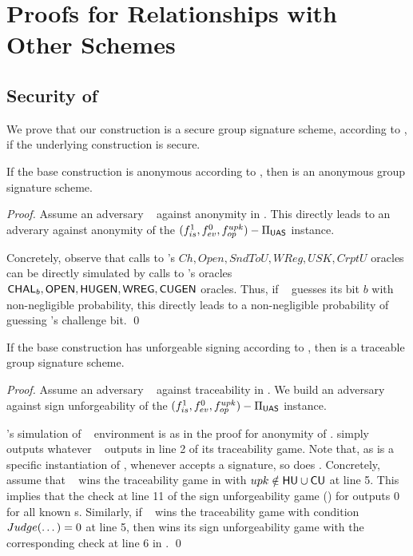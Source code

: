\section{Proofs for Relationships with Other Schemes}
\label{app:related-proofs}

\subsection{Security of \CUASGS}

We prove that our \CUASGS construction is a secure group signature scheme,
according to \cite{bsz05}, if the underlying \CUASGen construction is secure.

\begin{theorem}
  If the base \CUASGen construction is anonymous according to
  , then \CUASRing is an anonymous group signature
  scheme.
\end{theorem}

\begin{proof}
  Assume an adversary \adv~ against anonymity in \CUASGS. This directly leads
  to an adverary \advB against anonymity of the $(f_{is}^1,f_{ev}^0,
  f_{op}^{upk})-\Pi_{\mathsf{UAS}}$ instance.

  Concretely, observe that calls to \adv's $Ch,Open,SndToU,WReg,USK,CrptU$
  oracles can be directly simulated by calls to \advB's oracles $\mathsf{CHAL}_b,
  \mathsf{OPEN},\mathsf{HUGEN},\mathsf{WREG},\mathsf{CUGEN}$ oracles. Thus, if \adv~ guesses its bit $b$
  with non-negligible probability, this directly leads to a non-negligible
  probability of guessing \advB's challenge bit.
  \qed
\end{proof}

\begin{theorem}
  If the base \CUASGen construction has unforgeable signing according to
  , then \CUASGS is a traceable group signature
  scheme.
\end{theorem}

\begin{proof}
  Assume an adversary \adv~ against traceability in \CUASGS. We build an
  adversary \advB against sign unforgeability of the $(f_{is}^1,f_{ev}^0,
  f_{op}^{upk})-\Pi_{\mathsf{UAS}}$ instance.

  \advB's simulation of \adv~ environment is as in the proof for anonymity
  of \CUASGS. \advB simply outputs whatever \adv~ outputs in line 2 of its
  traceability game. Note that, as \CUASGS is a specific instantiation of
  \CUASGen, whenever \CUASGS accepts a signature, so does \CUASGen. Concretely,
  assume that \adv~ wins the traceability game in  with
  $upk \notin \mathsf{HU} \cup \mathsf{CU}$ at line 5. This implies that the check at line 11
  of the sign unforgeability game () for \CUASGen
  outputs $0$ for all known {\uid}s. Similarly, if \adv~ wins the traceability
  game with condition $Judge(\dots)=0$ at line 5, then \advB wins its sign
  unforgeability game with the corresponding check at line 6 in
  .
  \qed
\end{proof}

